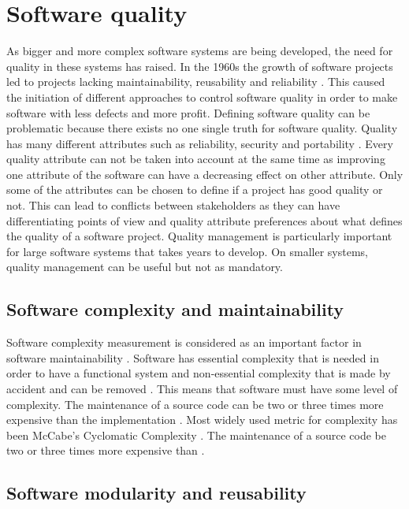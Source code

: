 \section{Software quality}
\label{chap:quality}

As bigger and more complex software systems are being developed, the need for quality in these systems has raised. In the 1960s the growth of software projects led to projects lacking maintainability, reusability and reliability \cite{sommerville2011software}. This caused the initiation of different approaches to control software quality in order to make software with less defects and more profit. Defining software quality can be problematic because there exists no one single truth for software quality. Quality has many different attributes such as reliability, security and portability \cite{sommerville2011software}. Every quality attribute can not be taken into account at the same time as improving one attribute of the software can have a decreasing effect on other attribute. Only some of the attributes can be chosen to define if a project has good quality or not. This can lead to conflicts between stakeholders as they can have differentiating points of view and quality attribute preferences about what defines the quality of a software project. Quality management is particularly important for large software systems that takes years to develop. On smaller systems, quality management can be useful but not as mandatory.

\subsection{Software complexity and maintainability}

Software complexity measurement is considered as an important factor in software maintainability \cite{banker1989software}. Software has essential complexity that is needed in order to have a functional system and non-essential complexity that is made by accident and can be removed \cite{softcomplex2014}. This means that software must have some level of complexity. The maintenance of a source code can be two or three times more expensive than the implementation \cite{banker1989software}. Most widely used metric for complexity has been McCabe’s Cyclomatic Complexity \cite{banker1989software}. The maintenance of a source code be two or three times more expensive than \cite{banker1989software}.

\subsection{Software modularity and reusability}

